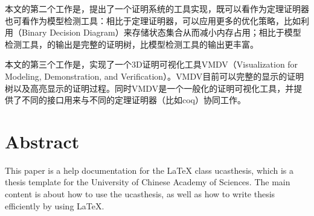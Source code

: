 本文的第二个工作是，提出了一个\SCTL{}证明系统的工具实现\sctlprov{}，\sctlprov{}既可以看作为定理证明器也可看作为模型检测工具：相比于定理证明器，\sctlprov{}可以应用更多的优化策略，比如利用\BDD{}（Binary Decision Diagram）来存储状态集合从而减小内存占用；相比于模型检测工具，\sctlprov{}的输出是完整的证明树，比模型检测工具的输出更丰富。

本文的第三个工作是，实现了一个3D证明可视化工具\textsf{VMDV}（Visualization for Modeling, Demonstration, and Verification）。\textsf{VMDV}目前可以完整的显示\sctlprov{}的证明树以及高亮显示\sctlprov{}的证明过程。同时\textsf{VMDV}是一个一般化的证明可视化工具，并提供了不同的接口用来与不同的定理证明器（比如coq）协同工作。




\chapter{Abstract}%
This paper is a help documentation for the \LaTeX{} class ucasthesis, which is  a thesis template for the University of Chinese Academy of Sciences. The main content is about how to use the ucasthesis, as well as how to write thesis efficiently by using \LaTeX{}.

